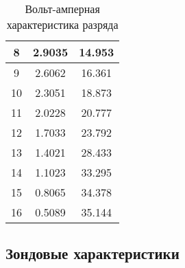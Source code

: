 \documentclass[a4paper,12pt]{article} %
\begin{document}
\begin{enumerate}
\begin{table}[h]
\begin{tabular}{|c|c|c|}
            8 & 2.9035 & 14.953 \\ \hline
            9 & 2.6062 & 16.361 \\ \hline
            10 & 2.3051 & 18.873 \\ \hline
            11 & 2.0228 & 20.777 \\ \hline
            12 & 1.7033 & 23.792 \\ \hline
            13 & 1.4021 & 28.433 \\ \hline
            14 & 1.1023 & 33.295 \\ \hline
            15 & 0.8065 & 34.378 \\ \hline
            16 & 0.5089 & 35.144 \\ \hline
	\end{tabular}
	\caption{Вольт-амперная характеристика разряда}
	\label{tab1}
    \end{table}
    
\end{enumerate}

\newpage

\subsection{Зондовые характеристики}
\end{document}
